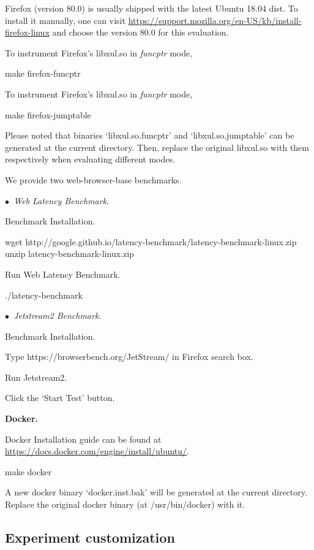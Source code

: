\documentclass{sigplanconf}
\begin{document}
{Firefox (version 80.0) is usually shipped with the latest Ubuntu 18.04 dist. 
To install it manually, one can visit \url{https://support.mozilla.org/en-US/kb/install-firefox-linux} and choose the version 80.0 for this evaluation.


To instrument Firefox’s libxul.so in \textit{funcptr} mode, 

make firefox-funcptr


To instrument Firefox’s libxul.so in \textit{funcptr} mode, 

make firefox-jumptable

Please noted that binaries `libxul.so.funcptr' and `libxul.so.jumptable' can be generated at the current directory. 
Then, replace the original libxul.so with them respectively when evaluating different modes.

We provide two web-browser-base benchmarks.

\vspace{1pt}\noindent$\bullet$\textit{~Web Latency Benchmark}.

Benchmark Installation.

wget http://google.github.io/latency-benchmark/latency-benchmark-linux.zip
unzip latency-benchmark-linux.zip

Run Web Latency Benchmark.

./latency-benchmark

\vspace{1pt}\noindent$\bullet$\textit{~Jetstream2 Benchmark}.

Benchmark Installation.

Type https://browserbench.org/JetStream/ in Firefox search box.

Run Jetstream2.

Click the `Start Test' button.

\vspace{2pt}\noindent\textbf{Docker.}

Docker Installation guide can be found at \url{https://docs.docker.com/engine/install/ubuntu/}.

make docker

A new docker binary `docker.inst.bak' will be generated at the current directory. Replace the original docker binary (at /usr/bin/docker) with it.


\subsection{Experiment customization}

}
\end{document}
